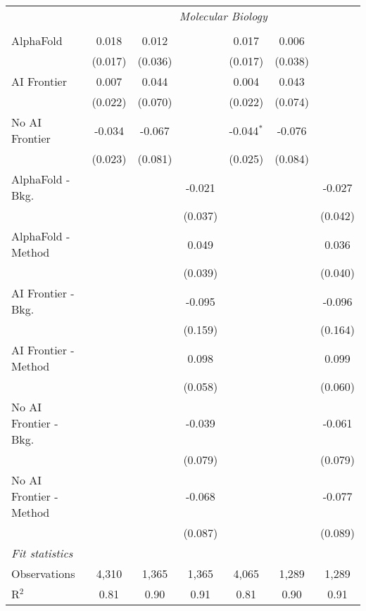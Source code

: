 \begin{tabular}{lcccccc}
 & \multicolumn{6}{c}{\textit{Molecular Biology}} \\ \\
   AlphaFold               & 0.018   & 0.012   &         & 0.017        & 0.006   &   \\   
                           & (0.017) & (0.036) &         & (0.017)      & (0.038) &   \\   
   AI Frontier             & 0.007   & 0.044   &         & 0.004        & 0.043   &   \\   
                           & (0.022) & (0.070) &         & (0.022)      & (0.074) &   \\   
   No AI Frontier          & -0.034  & -0.067  &         & -0.044$^{*}$ & -0.076  &   \\   
                           & (0.023) & (0.081) &         & (0.025)      & (0.084) &   \\   
   AlphaFold - Bkg.        &         &         & -0.021  &              &         & -0.027\\   
                           &         &         & (0.037) &              &         & (0.042)\\   
   AlphaFold - Method      &         &         & 0.049   &              &         & 0.036\\   
                           &         &         & (0.039) &              &         & (0.040)\\   
   AI Frontier - Bkg.      &         &         & -0.095  &              &         & -0.096\\   
                           &         &         & (0.159) &              &         & (0.164)\\   
   AI Frontier - Method    &         &         & 0.098   &              &         & 0.099\\   
                           &         &         & (0.058) &              &         & (0.060)\\   
   No AI Frontier - Bkg.   &         &         & -0.039  &              &         & -0.061\\   
                           &         &         & (0.079) &              &         & (0.079)\\   
   No AI Frontier - Method &         &         & -0.068  &              &         & -0.077\\   
                           &         &         & (0.087) &              &         & (0.089)\\   
   \midrule
   \emph{Fit statistics}\\
   Observations            & 4,310   & 1,365   & 1,365   & 4,065        & 1,289   & 1,289\\  
   R$^2$                   & 0.81    & 0.90    & 0.91    & 0.81         & 0.90    & 0.91\\  
   

\end{tabular}
